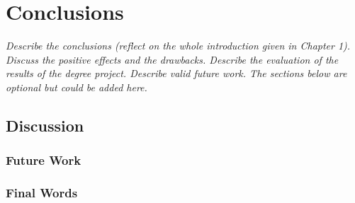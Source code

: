 \chapter{Conclusions}
\label{chap6}
\textit{Describe the conclusions (reflect on the whole introduction given in Chapter 1). Discuss the positive effects and the drawbacks. Describe the evaluation of the results of the degree project. Describe valid future work. The sections below are optional but could be added here.}

\section{Discussion}

\subsection{Future Work}

\subsection{Final Words}







